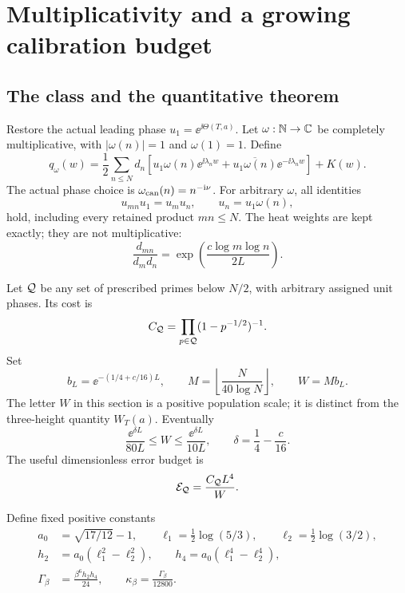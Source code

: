 \section{Multiplicativity and a growing calibration budget}\label{sec:multiplicative}

\subsection{The class and the quantitative theorem}

Restore the actual leading phase
\(u_1=\ee^{\ii\Theta(T,a)}\). Let
\(\omega:\mathbb N\to\mathbb C\) be completely multiplicative, with
\(|\omega(n)|=1\) and \(\omega(1)=1\). Define
\begin{equation}\label{eq:qomega}
 q_\omega(w)=\frac12\sum_{n\le N}d_n
 \left[u_1\omega(n)\ee^{\ii\lambda_nw}
        +\overline{u_1\omega(n)}\ee^{-\ii\lambda_nw}\right]+K(w).
\end{equation}
The actual phase choice is \(\omega_{\mathrm{can}}(n)=n^{-\mathrm i\nu}\).
For arbitrary \(\omega\), all identities
\[
 u_{mn}u_1=u_mu_n,\qquad u_n=u_1\omega(n),
\]
hold, including every retained product \(mn\le N\). The heat weights
are kept exactly; they are not multiplicative:
\begin{equation}\label{eq:weightnonmult}
 \frac{d_{mn}}{d_md_n}
       =\exp\left(\frac{c\log m\log n}{2L}\right).
\end{equation}

Let \(\mathcal Q\) be any set of prescribed primes below \(N/2\), with arbitrary
assigned unit phases. Its cost is
\begin{equation}\label{eq:CQ}
 C_{\mathcal Q}=\prod_{p\in\mathcal Q}(1-p^{-1/2})^{-1}.
\end{equation}
Set
\[
 b_L=\ee^{-(1/4+c/16)L},\qquad
 M=\left\lfloor\frac{N}{40\log N}\right\rfloor,\qquad
 W=M b_L.
\]
The letter \(W\) in this section is a positive population scale; it is
distinct from the three-height quantity \(W_T(a)\).
Eventually
\begin{equation}\label{eq:Wpopulation}
 \frac{\ee^{\delta L}}{80L}\le W\le\frac{\ee^{\delta L}}{10L},
 \qquad \delta=\frac14-\frac c{16}.
\end{equation}
The useful dimensionless error budget is
\begin{equation}\label{eq:calbudget}
 \mathcal E_{\mathcal Q}=\frac{C_{\mathcal Q}L^4}{W}.
\end{equation}

Define fixed positive constants
\begin{align}
 a_0&=\sqrt{17/12}-1,\qquad
 \ell_1=\tfrac12\log(5/3),\qquad \ell_2=\tfrac12\log(3/2),\\
 h_2&=a_0(\ell_1^2-\ell_2^2),\qquad
 h_4=a_0(\ell_1^4-\ell_2^4),\\
 \Gamma_\beta&=\frac{\beta^6h_2h_4}{24},\qquad
 \kappa_\beta=\frac{\Gamma_\beta}{12800}.
 \label{eq:constants}
\end{align}

